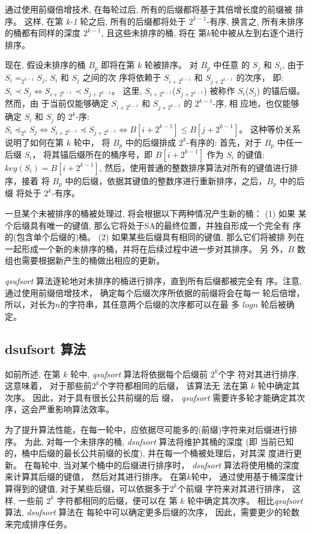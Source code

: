 通过使用前缀倍增技术, 在每轮过后, 所有的后缀都将基于其倍增长度的前缀被
排序。 这样, 在第 \emph{k-1} 轮之后, 所有的后缀都将处于 $2^{k-1}$-有序,
换言之, 所有未排序的桶都有同样的深度 $2^{k-1}$, 且这些未排序的桶, 将在
第$k$轮中被从左到右逐个进行排序。

现在, 假设未排序的桶 $B_p$ 即将在第 $k$ 轮被排序。 对 $B_p$ 中任意
的 $S_j$ 和 $S_i$, 由于 $S_i =_{2^{k-1}} S_j$, $S_i$ 和 $S_j$ 之间的次
序将依赖于 $S_{i+2^{k-1}}$ 和 $S_{j+2^{k-1}}$ 的次序， 即:
$S_i \prec S_j \iff S_{i+2^{k-1}} \prec S_{j+2^{k-1}}$。 这里,
$S_{i+2^{k-1}}$($S_{j+2^{k-1}}$) 被称作 $S_i$($S_j$) 的锚后缀。 然而，由
于当前仅能够确定 $S_{i+2^{k-1}}$ 和 $S_{j+2^{k-1}}$ 的 $2^{k-1}$-序, 相
应地，也仅能够确定 $S_i$ 和 $S_j$ 的 $2^k$-序:
$S_i \preceq_{2^k} S_j \iff S_{i+2^{k-1}} \preceq S_{j+2^{k-1}} \iff
B[i+2^{k-1}] \leq B[j+2^{k-1}]$。  这种等价关系说明了如何在第 $k$ 轮中，
将 $B_p$ 中的后缀排成 $2^k$-有序的: 首先，对于 $B_p$ 中任一后缀 $S_i$，
将其锚后缀所在的桶序号，即 $B[i+2^{k-1}]$ 作为 $S_i$ 的键值: $key(S_i)
= B[i+2^{k-1}]$, 然后，使用普通的整数排序算法对所有的键值进行排序，接着
将 $B_p$ 中的后缀，依据其键值的整数序进行重新排序，之后，$B_p$ 中的后缀
将处于 $2^k$-有序。

一旦某个未被排序的桶被处理过, 将会根据以下两种情况产生新的桶： (1) 如果
某个后缀具有唯一的键值, 那么它将处于SA的最终位置，并独自形成一个完全有
序的(包含单个后缀的)桶。 (2) 如果某些后缀具有相同的键值, 那么它们将被排
列在一起形成一个新的未排序的桶，并将在后续过程中进一步对其排序。 另
外，$B$ 数组也需要根据新产生的桶做出相应的更新。

\emph{qsufsort} 算法逐轮地对未排序的桶进行排序，直到所有后缀都被完全有
序。注意, 通过使用前缀倍增技术， 确定每个后缀次序所依据的前缀将会在每一
轮后倍增，所以，对长为$n$的字符串，其任意两个后缀的次序都可以在最
多 $logn$ 轮后被确定。

\subsection{dsufsort 算法}
\label{sec:dsufsort}

如前所述, 在第 $k$ 轮中, \emph{qsufsort} 算法将依据每个后缀前 $2^k$个字
符对其进行排序, 这意味着， 对于那些前$2^k$个字符都相同的后缀， 该算法无
法在第 $k$ 轮中确定其次序。 因此，对于具有很长公共前缀的后
缀， \emph{qsufsort} 需要许多轮才能确定其次序，这会严重影响算法效率。

为了提升算法性能，在每一轮中，应依据尽可能多的(前缀)字符来对后缀进行排
序。 为此, 对每一个未排序的桶, \emph{dsufsort} 算法将维护其桶的深度 (即
当前已知的，桶中后缀的最长公共前缀的长度), 并在每一个桶被处理后，对其深
度进行更新。 在每轮中, 当对某个桶中的后缀进行排序时， \emph{dsufsort}
算法将使用桶的深度来计算其后缀的键值， 然后对其进行排序。 在第$k$轮中，
通过使用基于桶深度计算得到的键值, 对于某些后缀，可以依据多于$2^k$个前缀
字符来对其进行排序， 这样, 一些前 $2^k$ 字符都相同的后缀，便可以在
第 $k$ 轮中确定其次序。 相比\emph{qsufsort}算法, \emph{dsufsort} 算法在
每轮中可以确定更多后缀的次序， 因此，需要更少的轮数来完成排序任务。


